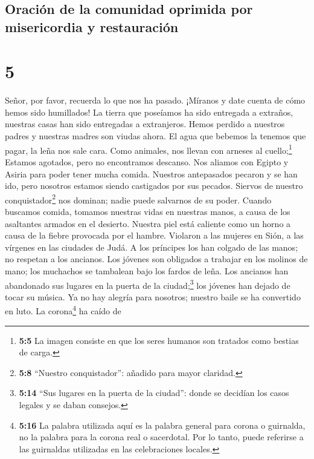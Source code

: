 \hypertarget{oraciuxf3n-de-la-comunidad-oprimida-por-misericordia-y-restauraciuxf3n}{%
\subsection{Oración de la comunidad oprimida por misericordia y
restauración}\label{oraciuxf3n-de-la-comunidad-oprimida-por-misericordia-y-restauraciuxf3n}}

\hypertarget{section-4}{%
\section{5}\label{section-4}}

 Señor, por favor, recuerda lo que nos ha pasado. ¡Míranos
y date cuenta de cómo hemos sido humillados!  La tierra
que poseíamos ha sido entregada a extraños, nuestras casas han sido
entregadas a extranjeros.  Hemos perdido a nuestros padres
y nuestras madres son viudas ahora.  El agua que bebemos
la tenemos que pagar, la leña nos sale cara.  Como
animales, nos llevan con arneses al cuello;\footnote{\textbf{5:5} La
  imagen consiste en que los seres humanos son tratados como bestias de
  carga.} Estamos agotados, pero no encontramos descanso. 
Nos aliamos con Egipto y Asiria para poder tener mucha comida.
 Nuestros antepasados pecaron y se han ido, pero nosotros
estamos siendo castigados por sus pecados.  Siervos de
nuestro conquistador\footnote{\textbf{5:8} ``Nuestro conquistador'':
  añadido para mayor claridad.} nos dominan; nadie puede salvarnos de su
poder.  Cuando buscamos comida, tomamos nuestras vidas en
nuestras manos, a causa de los asaltantes armados en el desierto.
 Nuestra piel está caliente como un horno a causa de la
fiebre provocada por el hambre.  Violaron a las mujeres
en Sión, a las vírgenes en las ciudades de Judá.  A los
príncipes los han colgado de las manos; no respetan a los ancianos.
 Los jóvenes son obligados a trabajar en los molinos de
mano; los muchachos se tambalean bajo los fardos de leña.
 Los ancianos han abandonado sus lugares en la puerta de
la ciudad;\footnote{\textbf{5:14} ``Sus lugares en la puerta de la
  ciudad'': donde se decidían los casos legales y se daban consejos.}
los jóvenes han dejado de tocar su música.  Ya no hay
alegría para nosotros; nuestro baile se ha convertido en luto.
 La corona\footnote{\textbf{5:16} La palabra utilizada
  aquí es la palabra general para corona o guirnalda, no la palabra para
  la corona real o sacerdotal. Por lo tanto, puede referirse a las
  guirnaldas utilizadas en las celebraciones locales.} ha caído de
